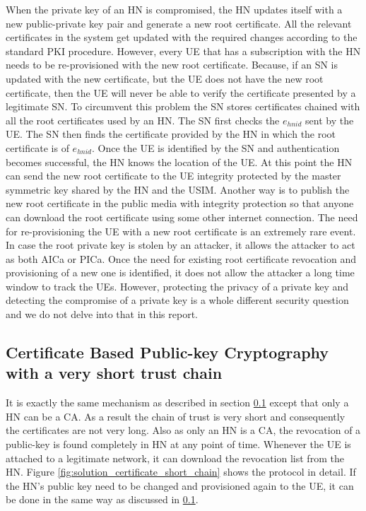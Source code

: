 \documentclass[lnicst,sechang,a4paper]{svmultln}
\begin{document}
When the private key of an HN is compromised, the HN updates itself with a new public-private key pair and generate a new root certificate. All the relevant certificates in the system get updated with the required changes according to the standard PKI procedure. However, every UE that has a subscription with the HN needs to be re-provisioned with the new root certificate. Because, if an SN is updated with the new certificate, but the UE does not have the new root certificate, then the UE will never be able to verify the certificate presented by a legitimate SN. To circumvent this problem the SN stores certificates chained with all the root certificates used by an HN. The SN first checks the $e_{hnid}$ sent by the UE. The SN then finds the certificate provided by the HN in which the root certificate is of $e_{hnid}$. Once the UE is identified by the SN and authentication becomes successful, the HN knows the location of the UE. At this point the HN can send the new root certificate to the UE integrity protected by the master symmetric key shared by the HN and the USIM. Another way is to publish the new root certificate in the public media with integrity protection so that anyone can download the root certificate using some other internet connection. The need for re-provisioning the UE with a new root certificate is an extremely rare event. In case the root private key is stolen by an attacker, it allows the attacker to act as both AICa or PICa. Once the need for existing root certificate revocation and provisioning of a new one is identified, it does not allow the attacker a long time window to track the UEs. However, protecting the privacy of a private key and detecting the compromise of a private key is a whole different security question and we do not delve into that in this report.


\subsection{Certificate Based Public-key Cryptography with a very short trust chain} 
\label{sub_sec:solution_certificate}
It is exactly the same mechanism as described in section \ref{sub_sec:solution_certificate} except that only a HN can be a CA. As a result the chain of trust is very short and consequently the certificates are not very long. Also as only an HN is a CA, the revocation of a public-key is found completely in HN at any point of time. Whenever the UE is attached to a legitimate network, it can download the revocation list from the HN. Figure \ref{fig:solution_certificate_short_chain} shows the protocol in detail. If the HN's public key need to be changed and provisioned again to the UE, it can be done in the same way as discussed in \ref{sub_sec:solution_certificate}.
\end{document}
